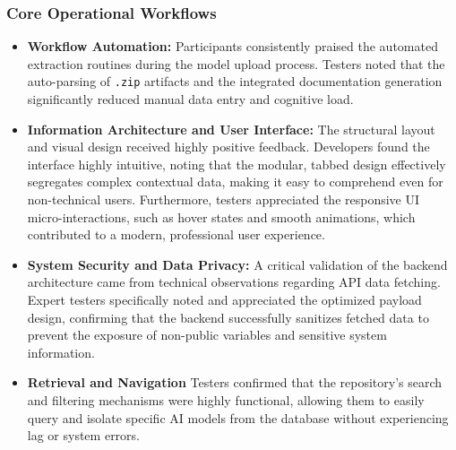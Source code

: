 \documentclass{icsthesis}
\begin{document}
\begin{mainmatter}
            \subsubsection{\textbf{Core Operational Workflows}}
            \begin{itemize}
                \item \textbf{Workflow Automation:}
                Participants consistently praised the automated extraction routines during the model upload process. Testers noted that the auto-parsing of \texttt{.zip} artifacts and the integrated documentation generation significantly reduced manual data entry and cognitive load.
                \item \textbf{Information Architecture and User Interface:}
                The structural layout and visual design received highly positive feedback. Developers found the interface highly intuitive, noting that the modular, tabbed design effectively segregates complex contextual data, making it easy to comprehend even for non-technical users. Furthermore, testers appreciated the responsive UI micro-interactions, such as hover states and smooth animations, which contributed to a modern, professional user experience.
                \item \textbf{System Security and Data Privacy:}
                A critical validation of the backend architecture came from technical observations regarding API data fetching. Expert testers specifically noted and appreciated the optimized payload design, confirming that the backend successfully sanitizes fetched data to prevent the exposure of non-public variables and sensitive system information.
                \item \textbf{Retrieval and Navigation}
                Testers confirmed that the repository's search and filtering mechanisms were highly functional, allowing them to easily query and isolate specific AI models from the database without experiencing lag or system errors.
            \end{itemize}
            

\end{mainmatter}
\end{document}

